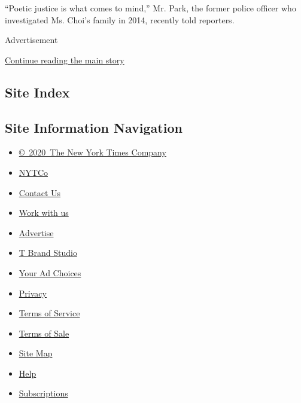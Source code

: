 ``Poetic justice is what comes to mind,'' Mr. Park, the former police
officer who investigated Ms. Choi's family in 2014, recently told
reporters.

Advertisement

\protect\hyperlink{after-bottom}{Continue reading the main story}

\hypertarget{site-index}{%
\subsection{Site Index}\label{site-index}}

\hypertarget{site-information-navigation}{%
\subsection{Site Information
Navigation}\label{site-information-navigation}}

\begin{itemize}
\tightlist
\item
  \href{https://help.nytimes.com/hc/en-us/articles/115014792127-Copyright-notice}{©~2020~The
  New York Times Company}
\end{itemize}

\begin{itemize}
\tightlist
\item
  \href{https://www.nytco.com/}{NYTCo}
\item
  \href{https://help.nytimes.com/hc/en-us/articles/115015385887-Contact-Us}{Contact
  Us}
\item
  \href{https://www.nytco.com/careers/}{Work with us}
\item
  \href{https://nytmediakit.com/}{Advertise}
\item
  \href{http://www.tbrandstudio.com/}{T Brand Studio}
\item
  \href{https://www.nytimes.com/privacy/cookie-policy\#how-do-i-manage-trackers}{Your
  Ad Choices}
\item
  \href{https://www.nytimes.com/privacy}{Privacy}
\item
  \href{https://help.nytimes.com/hc/en-us/articles/115014893428-Terms-of-service}{Terms
  of Service}
\item
  \href{https://help.nytimes.com/hc/en-us/articles/115014893968-Terms-of-sale}{Terms
  of Sale}
\item
  \href{https://spiderbites.nytimes.com}{Site Map}
\item
  \href{https://help.nytimes.com/hc/en-us}{Help}
\item
  \href{https://www.nytimes.com/subscription?campaignId=37WXW}{Subscriptions}
\end{itemize}
